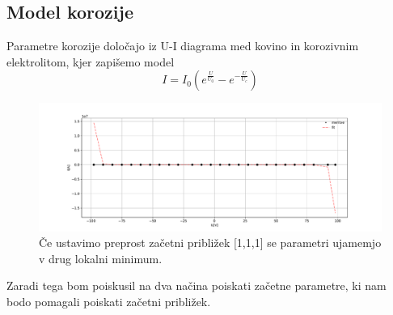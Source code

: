 \documentclass[11pt, a4paper]{article}
\begin{document}
\subsection{Model korozije}
Parametre korozije določajo iz U-I diagrama med kovino in korozivnim elektrolitom, kjer zapišemo model
\begin{equation}
I = I_0 ( e^{\frac{U}{U_0}} - e^{-\frac{U}{U_c}})
\end{equation}


\begin{figure}[H]
\hspace*{-2.5cm}     
  \includegraphics[width=20.cm] {tretja_slab_fit.pdf}
 \caption{Če ustavimo preprost začetni približek [1,1,1] se parametri ujamemjo v drug lokalni minimum.}
\end{figure}
Zaradi tega bom poiskusil na dva načina poiskati začetne parametre, ki nam bodo pomagali poiskati začetni približek.
\end{document}
